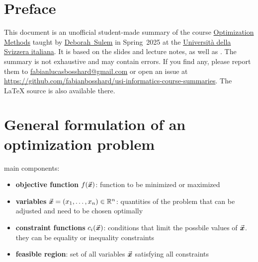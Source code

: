 \pagestyle{plain}


\maketitle
\tableofcontents


\section*{Preface}

This document is an unofficial student-made summary of the course 
\href{https://search.usi.ch/en/courses/35270756/optimization-methods}{{Optimization Methods}} taught by \href{https://search.usi.ch/en/people/7ae0ccfefe31ec77de71003997572fbd/sulem-deborah}{Deborah~Sulem} in Spring~2025 at the \href{https://www.usi.ch/en}{Università della Svizzera italiana}.
It is based on the slides and lecture notes, as well as \cite{nocedal2006}.
The summary is not exhaustive and may contain errors.
If you find any, please report them to \href{mailto:fabianlucasbosshard@gmail.com}{fabianlucasbosshard@gmail.com} or open an issue at \url{https://github.com/fabianbosshard/usi-informatics-course-summaries}.
The \LaTeX{} source is also available there.

\doclicenseThis

\renewcommand{\emph}[1]{\textcolor{black}{#1}}
\printbibliography[heading=bibintoc,title={References}]
\renewcommand{\emph}[1]{\textcolor{mypurple}{#1}}













\clearpage
{}
\pagestyle{scrheadings}
\section{General formulation of an optimization problem}

main components:
\begin{itemize}
	\item \textbf{objective function} $f(\vec{\boldsymbol{x}})$: function to be minimized or maximized
	\item \textbf{variables} $\vec{\boldsymbol{x}} = (x_1, \ldots, x_n) \in \mathbb{R}^n$: quantities of the problem that can be adjusted and need to be chosen \emph{optimally}
	\item \textbf{constraint functions} $c_i(\vec{\boldsymbol{x}})$: conditions that limit the possbile values of $\vec{\boldsymbol{x}}$. they can be \emph{equality} or \emph{inequality} constraints
	\item \textbf{feasible region}: set of all variables $\vec{\boldsymbol{x}}$ satisfying all constraints
\end{itemize}

